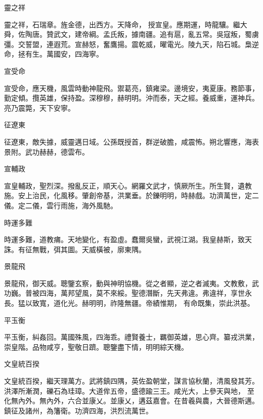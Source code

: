 \begin{pinyinscope}
 靈之祥



 靈之祥，石瑞章。旌金德，出西方。天降命，
 授宣皇。應期運，時龍驤。繼大舜，佐陶唐。贊武文，建帝綱。孟氏叛，據南疆。追有扈，亂五常。吳寇叛，蜀虜彊。交誓盟，連遐荒。宣赫怒，奮鷹揚。震乾威，曜電光。陵九天，陷石城。梟逆命，拯有生。萬國安，四海寧。



 宣受命



 宣受命，應天機，風雲時動神龍飛。禦葛亮，鎮雍梁。邊境安，夷夏康。務節事，勤定傾。攬英雄，保持盈。深穆穆，赫明明。沖而泰，天之經。養威重，運神兵。亮乃震斃，天下安寧。



 征遼東



 征遼東，敵失據，威靈邁日域。公孫既授首，群逆破膽，咸震怖。朔北響應，海表景附。武功赫赫，德雲布。



 宣輔政



 宣皇輔政，聖烈深。撥亂反正，順天心。網羅文武才，慎厥所生。所生賢，遺教施。安上治民，化風移。肇創帝基，洪業垂。於鑠明明，時赫戲。功濟萬世，定二儀。定二儀，雲行雨施，海外風馳。



 時運多難



 時運多難，道教痡。天地變化，有盈虛。蠢爾吳蠻，武視江湖。我皇赫斯，致天誅。有征無戰，弭其圖。天威橫被，廓東隅。



 景龍飛



 景龍飛，御天威。聰鑒玄察，動與神明協機。從之者顯，逆之者滅夷。文教敷，武功巍。普被四海，萬邦望風，莫不來綏。聖德潛斷，先天弗違。弗違祥，享世永長。猛以致寬，道化光。赫明明，祚隆無疆。帝績惟期，
 有命既集，崇此洪基。



 平玉衡



 平玉衡，糾姦回。萬國殊風，四海乖。禮賢養士，羈御英雄，思心齊。纂戎洪業，崇皇階。品物咸亨，聖敬日躋。聰鑒盡下情，明明綜天機。



 文皇統百揆



 文皇統百揆，繼天理萬方。武將鎮四隅，英佐盈朝堂，謀言協秋蘭，清風發其芳。洪澤所漸潤，礫石為珪璋。大道侔五帝，盛德踰三王。咸光大，上參天與地，
 至化無內外。無內外，六合並康乂。並康乂，遘茲嘉會。在昔羲與農，大晉德斯邁。鎮征及諸州，為籓衛。功濟四海，洪烈流萬世。




\end{pinyinscope}
